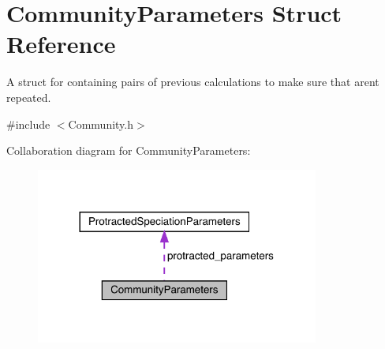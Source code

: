 \hypertarget{struct_community_parameters}{}\section{Community\+Parameters Struct Reference}
\label{struct_community_parameters}


A struct for containing pairs of previous calculations to make sure that aren\textquotesingle{}t repeated.  




{\ttfamily \#include $<$Community.\+h$>$}



Collaboration diagram for Community\+Parameters\+:\nopagebreak
\begin{figure}[H]
\begin{center}
\leavevmode
\includegraphics[width=264pt]{struct_community_parameters__coll__graph}
\end{center}
\end{figure}
